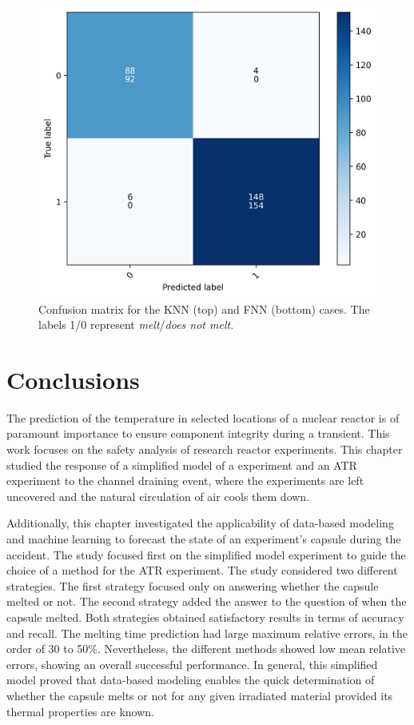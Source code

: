 \begin{figure}[htbp!] %
  \centering
  \includegraphics[width=0.45\linewidth]{figures/atr-classification_cnfm}
  \hfill
  \caption{Confusion matrix for the KNN (top) and FNN (bottom) cases. The labels 1/0 represent \textit{melt}/\textit{does not melt}.}
  \label{fig:atr-class-1}
\end{figure}


\section{Conclusions}

The prediction of the temperature in selected locations of a nuclear reactor is of paramount importance to ensure component integrity during a transient.
This work focuses on the safety analysis of research reactor experiments.
This chapter studied the response of a simplified model of a experiment and an ATR experiment to the channel draining event, where the experiments are left uncovered and the natural circulation of air cools them down.

Additionally, this chapter investigated the applicability of data-based modeling and machine learning to forecast the state of an experiment's capsule during the accident.
The study focused first on the simplified model experiment to guide the choice of a method for the ATR experiment.
The study considered two different strategies.
The first strategy focused only on answering whether the capsule melted or not.
The second strategy added the answer to the question of when the capsule melted.
Both strategies obtained satisfactory results in terms of accuracy and recall.
The melting time prediction had large maximum relative errors, in the order of 30 to 50\%.
Nevertheless, the different methods showed low mean relative errors, showing an overall successful performance.
In general, this simplified model proved that data-based modeling enables the quick determination of whether the capsule melts or not for any given irradiated material provided its thermal properties are known.

